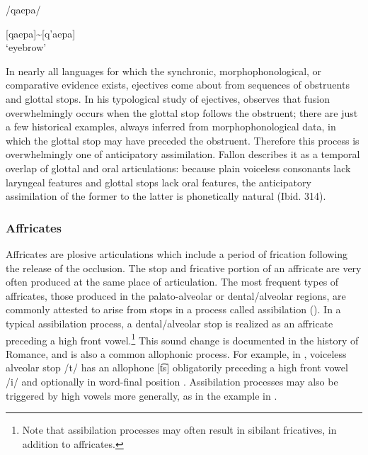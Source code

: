 \ea\label{ex:4.44}

/qaepa/

[qaepa]{\textasciitilde}[q’aepa]\\
\glt ‘eyebrow’
\citep[36]{Vidal2001}
\z

  In nearly all languages for which the synchronic, morphophonological, or comparative evidence exists, ejectives come about from sequences of obstruents and glottal stops. In his typological study of ejectives, \citet[314]{Fallon2002} observes that fusion overwhelmingly occurs when the glottal stop follows the obstruent; there are just a few historical examples, always inferred from morphophonological data, in which the glottal stop may have preceded the obstruent. Therefore this process is overwhelmingly one of anticipatory assimilation. Fallon describes it as a temporal overlap of glottal and oral articulations: because plain voiceless consonants lack laryngeal features and glottal stops lack oral features, the anticipatory assimilation of the former to the latter is phonetically natural (Ibid. 314).

\subsubsection{{Affricates}}\label{sec:4.5.2.4}

  Affricates are plosive articulations which include a period of frication following the release of the occlusion. The stop and fricative portion of an affricate are very often produced at the same place of articulation. The most frequent types of affricates, those produced in the palato-alveolar or dental/alveolar regions, are commonly attested to arise from stops in a process called assibilation (\citealt{HallHamann2006,Telfer2006}). In a typical assibilation process, a dental/alveolar stop is realized as an affricate preceding a high front vowel.\footnote{{Note that assibilation processes may often result in sibilant fricatives, in addition to affricates.}} This sound change is documented in the history of Romance, and is also a common allophonic process. For example, in , voiceless alveolar stop /t/ has an allophone [t͡s] obligatorily preceding a high front vowel /i/ and optionally in word-final position \citep[333]{Fortescue1984}. Assibilation processes may also be triggered by high vowels more generally, as in the  example in .

\ea\label{ex:4.45}

